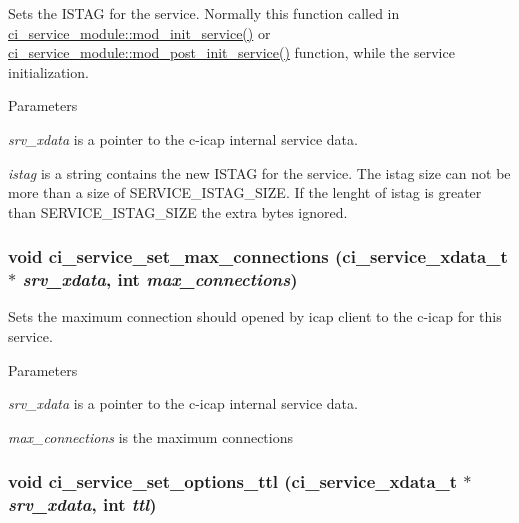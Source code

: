 Sets the ISTAG for the service. Normally this function called in \hyperlink{structci__service__module_acf9f56283f9418715be2f87967928876}{ci\_\-service\_\-module::mod\_\-init\_\-service()} or \hyperlink{structci__service__module_a3975fa968c80e30d77f3f1bac100e9e1}{ci\_\-service\_\-module::mod\_\-post\_\-init\_\-service()} function, while the service initialization. 
\begin{DoxyParams}{Parameters}
\item[{\em srv\_\-xdata}]is a pointer to the c-\/icap internal service data. \item[{\em istag}]is a string contains the new ISTAG for the service. The istag size can not be more than a size of SERVICE\_\-ISTAG\_\-SIZE. If the lenght of istag is greater than SERVICE\_\-ISTAG\_\-SIZE the extra bytes ignored. \end{DoxyParams}
\hypertarget{group__SERVICES_ga020a120d936c2061d20bdad2795e81dd}{
\subsubsection[{ci\_\-service\_\-set\_\-max\_\-connections}]{\setlength{\rightskip}{0pt plus 5cm}void ci\_\-service\_\-set\_\-max\_\-connections ({\bf ci\_\-service\_\-xdata\_\-t} $\ast$ {\em srv\_\-xdata}, \/  int {\em max\_\-connections})}}
\label{group__SERVICES_ga020a120d936c2061d20bdad2795e81dd}


Sets the maximum connection should opened by icap client to the c-\/icap for this service. 
\begin{DoxyParams}{Parameters}
\item[{\em srv\_\-xdata}]is a pointer to the c-\/icap internal service data. \item[{\em max\_\-connections}]is the maximum connections \end{DoxyParams}
\hypertarget{group__SERVICES_gadadb6757c8fee88a00e777bcc231433c}{
\subsubsection[{ci\_\-service\_\-set\_\-options\_\-ttl}]{\setlength{\rightskip}{0pt plus 5cm}void ci\_\-service\_\-set\_\-options\_\-ttl ({\bf ci\_\-service\_\-xdata\_\-t} $\ast$ {\em srv\_\-xdata}, \/  int {\em ttl})}}
\label{group__SERVICES_gadadb6757c8fee88a00e777bcc231433c}


